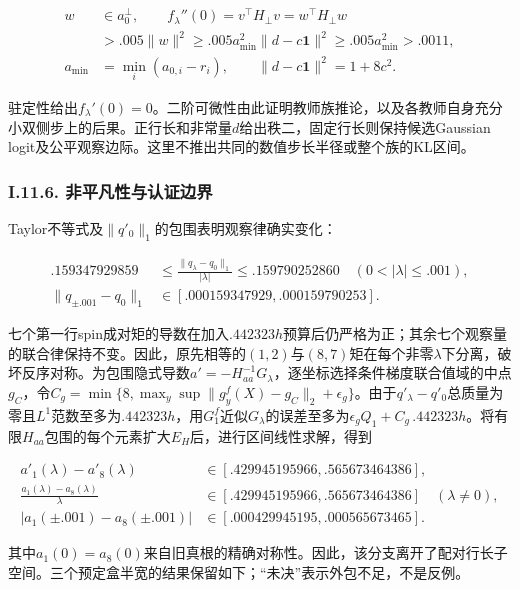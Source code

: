 \documentclass[11pt,a4paper]{article}
\begin{document}
\[
\begin{aligned}
w&\in a_0^\perp,\qquad
f_\lambda''(0)=v^\top H_\perp v=w^\top H_\perp w\\
&>.005\|w\|^2\ge .005a_{\min}^2\|d-c\mathbf1\|^2
\ge .005a_{\min}^2>.0011,\\
a_{\min}&=\min_i(a_{0,i}-r_i),\qquad
\|d-c\mathbf1\|^2=1+8c^2.
\end{aligned}
\tag{I.68}
\]

驻定性给出\(f_\lambda'(0)=0\)。二阶可微性由此证明教师族推论，以及各教师自身充分小双侧步上的后果。正行长和非常量\(d\)给出秩二，固定行长则保持候选Gaussian
logit及公平观察边际。这里不推出共同的数值步长半径或整个族的KL区间。

\subsubsection*{I.11.6.
非平凡性与认证边界}\label{i.11.6.-ux975eux5e73ux51e1ux6027ux4e0eux8ba4ux8bc1ux8fb9ux754c}

Taylor不等式及\(\|q'_0\|_1\)的包围表明观察律确实变化：

\[
\begin{aligned}
.159347929859&\le\frac{\|q_\lambda-q_0\|_1}{|\lambda|}
\le .159790252860\quad(0<|\lambda|\le .001),\\
\|q_{\pm.001}-q_0\|_1&\in[.000159347929,.000159790253].
\end{aligned}
\tag{I.69}
\]

七个第一行spin成对矩的导数在加入\(.442323h\)预算后仍严格为正；其余七个观察量的联合律保持不变。因此，原先相等的\((1,2)\)与\((8,7)\)矩在每个非零\(\lambda\)下分离，破坏反序对称。为包围隐式导数\(a'=-H_{aa}^{-1}G_\lambda\)，逐坐标选择条件梯度联合值域的中点\(g_C\)，令\(C_g=\min\{8,\max_y\sup\|g_y^f(X)-g_C\|_2+\epsilon_g\}\)。由于\(q'_\lambda-q'_0\)总质量为零且\(L^1\)范数至多为\(.442323h\)，用\(G_1^f\)近似\(G_\lambda\)的误差至多为\(\epsilon_gQ_1+C_g\,.442323h\)。将有限\(H_{aa}\)包围的每个元素扩大\(E_H\)后，进行区间线性求解，得到

\[
\begin{aligned}
a'_1(\lambda)-a'_8(\lambda)&\in[.429945195966,.565673464386],\\
\frac{a_1(\lambda)-a_8(\lambda)}{\lambda}
&\in[.429945195966,.565673464386]\quad(\lambda\ne0),\\
|a_1(\pm.001)-a_8(\pm.001)|&\in[.000429945195,.000565673465].
\end{aligned}
\tag{I.70}
\]

其中\(a_1(0)=a_8(0)\)来自旧真根的精确对称性。因此，该分支离开了配对行长子空间。三个预定盒半宽的结果保留如下；``未决''表示外包不足，不是反例。
\end{document}
